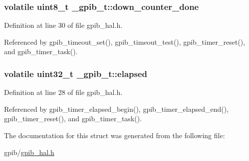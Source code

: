 \hypertarget{struct__gpib__t_af2622dd8668ecb24c42a2da2d8956538}{
\subsubsection[{down\-\_\-counter\-\_\-done}]{\setlength{\rightskip}{0pt plus 5cm}volatile uint8\-\_\-t \-\_\-gpib\-\_\-t\-::down\-\_\-counter\-\_\-done}}\label{struct__gpib__t_af2622dd8668ecb24c42a2da2d8956538}


Definition at line 30 of file gpib\-\_\-hal.\-h.



Referenced by gpib\-\_\-timeout\-\_\-set(), gpib\-\_\-timeout\-\_\-test(), gpib\-\_\-timer\-\_\-reset(), and gpib\-\_\-timer\-\_\-task().

\hypertarget{struct__gpib__t_a99a38aef880eb075f625f33d7bac31dd}{
\subsubsection[{elapsed}]{\setlength{\rightskip}{0pt plus 5cm}volatile uint32\-\_\-t \-\_\-gpib\-\_\-t\-::elapsed}}\label{struct__gpib__t_a99a38aef880eb075f625f33d7bac31dd}


Definition at line 28 of file gpib\-\_\-hal.\-h.



Referenced by gpib\-\_\-timer\-\_\-elapsed\-\_\-begin(), gpib\-\_\-timer\-\_\-elapsed\-\_\-end(), gpib\-\_\-timer\-\_\-reset(), and gpib\-\_\-timer\-\_\-task().



The documentation for this struct was generated from the following file\-:\begin{DoxyCompactItemize}
\item 
gpib/\hyperlink{gpib__hal_8h}{gpib\-\_\-hal.\-h}\end{DoxyCompactItemize}
